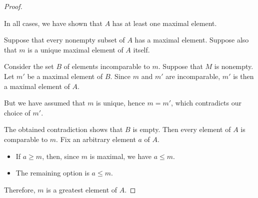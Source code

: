 \begin{proof}
\begin{itemize}
    In all cases, we have shown that \( A \) has at least one maximal element.
  \end{itemize}

   Suppose that every nonempty subset of \( A \) has a maximal element. Suppose also that \( m \) is a unique maximal element of \( A \) itself.

  Consider the set \( B \) of elements incomparable to \( m \). Suppose that \( M \) is nonempty. Let \( m' \) be a maximal element of \( B \). Since \( m \) and \( m' \) are incomparable, \( m' \) is then a maximal element of \( A \).

  But we have assumed that \( m \) is unique, hence \( m = m' \), which contradicts our choice of \( m' \).

  The obtained contradiction shows that \( B \) is empty. Then every element of \( A \) is comparable to \( m \). Fix an arbitrary element \( a \) of \( A \).
  \begin{itemize}
    \item If \( a \geq m \), then, since \( m \) is maximal, we have \( a \leq m \).
    \item The remaining option is \( a \leq m \).
  \end{itemize}

  Therefore, \( m \) is a greatest element of \( A \).
\end{proof}

